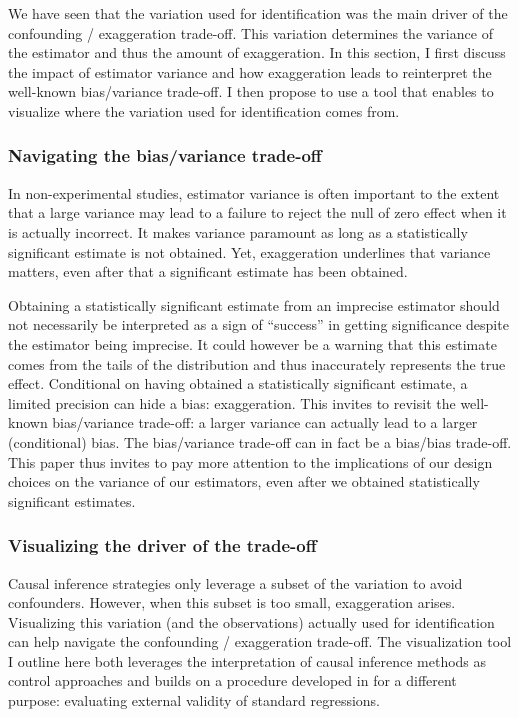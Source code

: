 \documentclass[usletter, 12pt]{article}
\begin{document}
			We have seen that the variation used for identification was the main driver of the confounding / exaggeration trade-off. This variation determines the variance of the estimator and thus the amount of exaggeration. In this section, I first discuss the impact of estimator variance and how exaggeration leads to reinterpret the well-known bias/variance trade-off. I then propose to use a tool that enables to visualize where the variation used for identification comes from.
		
			\subsubsection{Navigating the bias/variance trade-off}
			
				In non-experimental studies, estimator variance is often important to the extent that a large variance may lead to a failure to reject the null of zero effect when it is actually incorrect. It makes variance paramount as long as a statistically significant estimate is not obtained. Yet, exaggeration underlines that variance matters, even after that a significant estimate has been obtained. 
			
				 Obtaining a statistically significant estimate from an imprecise estimator should not necessarily be interpreted as a sign of ``success'' in getting significance despite the estimator being imprecise. It could however be a warning that this estimate comes from the tails of the distribution and thus inaccurately represents the true effect. Conditional on having obtained a statistically significant estimate, a limited precision can hide a bias: exaggeration. This invites to revisit the well-known bias/variance trade-off: a larger variance can actually lead to a larger (conditional) bias. The bias/variance trade-off can in fact be a bias/bias trade-off. This paper thus invites to pay more attention to the implications of our design choices on the variance of our estimators, even after we obtained statistically significant estimates.
			
			\subsubsection{Visualizing the driver of the trade-off}
		
				Causal inference strategies only leverage a subset of the variation to avoid confounders. However, when this subset is too small, exaggeration arises. Visualizing this variation (and the observations) actually used for identification can help navigate the confounding / exaggeration trade-off. The visualization tool I outline here both leverages the interpretation of causal inference methods as control approaches and builds on a procedure developed in \cite{aronow_does_2016} for a different purpose: evaluating external validity of standard regressions.
				
\end{document}
